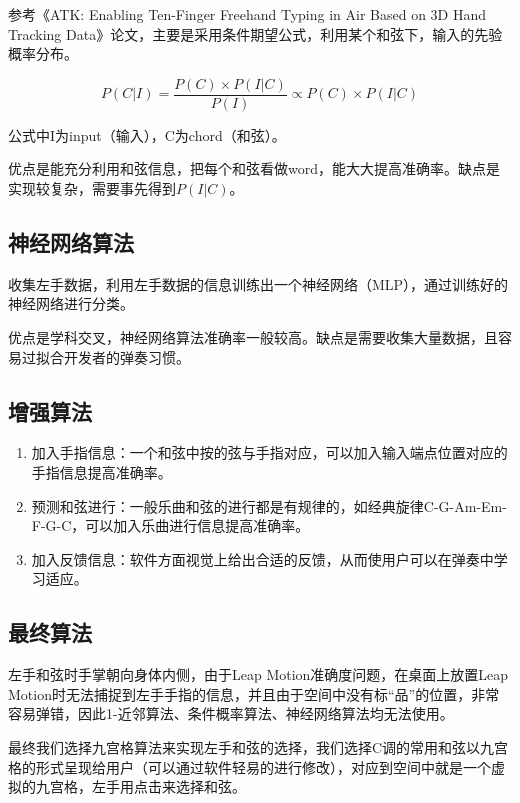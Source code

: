         参考《ATK: Enabling Ten-Finger Freehand Typing in Air Based on 3D Hand Tracking Data》论文，主要是采用条件期望公式，利用某个和弦下，输入的先验概率分布。

        $$P(C|I)=\frac{P(C) \times P(I|C)}{P(I)}\propto P(C)\times P(I|C)$$

        公式中I为input（输入），C为chord（和弦）。

        优点是能充分利用和弦信息，把每个和弦看做word，能大大提高准确率。缺点是实现较复杂，需要事先得到$P(I|C)$。

        \subsection{神经网络算法}

        收集左手数据，利用左手数据的信息训练出一个神经网络（MLP），通过训练好的神经网络进行分类。

        优点是学科交叉，神经网络算法准确率一般较高。缺点是需要收集大量数据，且容易过拟合开发者的弹奏习惯。

        \subsection{增强算法}

        \begin{enumerate}
            \item{加入手指信息}：一个和弦中按的弦与手指对应，可以加入输入端点位置对应的手指信息提高准确率。
            \item{预测和弦进行}：一般乐曲和弦的进行都是有规律的，如经典旋律C-G-Am-Em-F-G-C，可以加入乐曲进行信息提高准确率。
            \item{加入反馈信息}：软件方面视觉上给出合适的反馈，从而使用户可以在弹奏中学习适应。
        \end{enumerate}

        \subsection{最终算法}

        左手和弦时手掌朝向身体内侧，由于Leap Motion准确度问题，在桌面上放置Leap Motion时无法捕捉到左手手指的信息，并且由于空间中没有标“品”的位置，非常容易弹错，因此1-近邻算法、条件概率算法、神经网络算法均无法使用。

        最终我们选择九宫格算法来实现左手和弦的选择，我们选择C调的常用和弦以九宫格的形式呈现给用户（可以通过软件轻易的进行修改），对应到空间中就是一个虚拟的九宫格，左手用点击来选择和弦。

